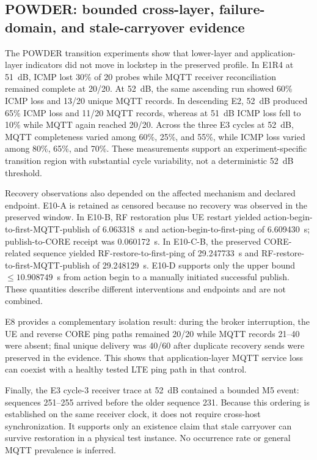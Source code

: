 \documentclass[journal]{IEEEtran}
\begin{document}
\subsection{POWDER: bounded cross-layer, failure-domain, and stale-carryover evidence}

The POWDER transition experiments show that lower-layer and application-layer indicators did not move in lockstep in the preserved profile. In E1R4 at 51~dB, ICMP lost 30\% of 20 probes while MQTT receiver reconciliation remained complete at 20/20. At 52~dB, the same ascending run showed 60\% ICMP loss and 13/20 unique MQTT records. In descending E2, 52~dB produced 65\% ICMP loss and 11/20 MQTT records, whereas at 51~dB ICMP loss fell to 10\% while MQTT again reached 20/20. Across the three E3 cycles at 52~dB, MQTT completeness varied among 60\%, 25\%, and 55\%, while ICMP loss varied among 80\%, 65\%, and 70\%. These measurements support an experiment-specific transition region with substantial cycle variability, not a deterministic 52~dB threshold.

Recovery observations also depended on the affected mechanism and declared endpoint. E10-A is retained as censored because no recovery was observed in the preserved window. In E10-B, RF restoration plus UE restart yielded action-begin-to-first-MQTT-publish of 6.063318~s and action-begin-to-first-ping of 6.609430~s; publish-to-CORE receipt was 0.060172~s. In E10-C-B, the preserved CORE-related sequence yielded RF-restore-to-first-ping of 29.247733~s and RF-restore-to-first-MQTT-publish of 29.248129~s. E10-D supports only the upper bound $\leq 10.908749$~s from action begin to a manually initiated successful publish. These quantities describe different interventions and endpoints and are not combined.

E8 provides a complementary isolation result: during the broker interruption, the UE and reverse CORE ping paths remained 20/20 while MQTT records 21--40 were absent; final unique delivery was 40/60 after duplicate recovery sends were preserved in the evidence. This shows that application-layer MQTT service loss can coexist with a healthy tested LTE ping path in that control.

Finally, the E3 cycle-3 receiver trace at 52~dB contained a bounded M5 event: sequences 251--255 arrived before the older sequence 231. Because this ordering is established on the same receiver clock, it does not require cross-host synchronization. It supports only an existence claim that stale carryover can survive restoration in a physical test instance. No occurrence rate or general MQTT prevalence is inferred.
\end{document}
